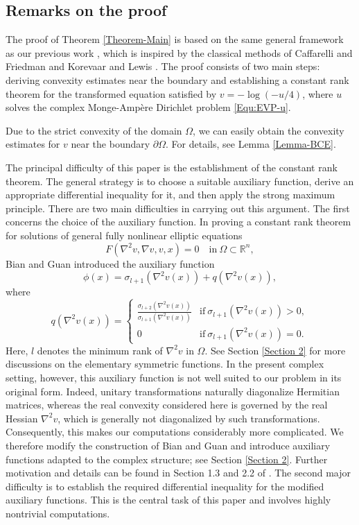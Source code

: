 \documentclass[11pt]{amsart}
\numberwithin{theorem}{section}
\numberwithin{equation}{section}
\begin{document}
\subsection{Remarks on the proof}\label{Section 1.3}
The proof of Theorem \ref{Theorem-Main} is based on the same general framework as our previous work \cite{Zhang-Zhou2025}, which is inspired by the classical methods of Caffarelli and Friedman \cite{Caffarelli-Friedman1985} and Korevaar and Lewis \cite{Korevaar-Lewis1987}. The proof consists of two main steps: deriving convexity estimates near the boundary and establishing a constant rank theorem for the transformed equation satisfied by $v=-\log(-u/4)$, where $u$ solves the complex Monge-Amp\`{e}re Dirichlet problem \eqref{Equ:EVP-u}.

Due to the strict convexity of the domain $\Omega$, we can easily obtain the convexity estimates for $v$ near the boundary $\partial\Omega$. For details, see Lemma \ref{Lemma-BCE}.

The principal difficulty of this paper is the establishment of the constant rank theorem. The general strategy is to choose a suitable auxiliary function, derive an appropriate differential inequality for it, and then apply the strong maximum principle. There are two main difficulties in carrying out this argument. The first concerns the choice of the auxiliary function. In proving a constant rank theorem for solutions of general fully nonlinear elliptic equations $$F(\nabla^2v,\nabla v,v,x)=0\quad\mathrm{in}\ \Omega\subset\mathbb{R}^n,$$ Bian and Guan \cite{Bian-Guan2009} introduced the auxiliary function $$\phi(x)=\sigma_{l+1}(\nabla^2v(x))+q(\nabla^2v(x)),$$ where $$q(\nabla^2v(x))=\begin{cases}
\frac{\sigma_{l+2}(\nabla^2v(x))}{\sigma_{l+1}(\nabla^2v(x))} & \mathrm{if}\ \sigma_{l+1}(\nabla^2v(x))>0,\\
0 & \mathrm{if}\ \sigma_{l+1}(\nabla^2v(x))=0.
\end{cases}$$ Here, $l$ denotes the minimum rank of $\nabla^2v$ in $\Omega$. See Section \ref{Section 2} for more discussions on the elementary symmetric functions. In the present complex setting, however, this auxiliary function is not well suited to our problem in its original form. Indeed, unitary transformations naturally diagonalize Hermitian matrices, whereas the real convexity considered here is governed by the real Hessian $\nabla^2v$, which is generally not diagonalized by such transformations. Consequently, this makes our computations considerably more complicated. We therefore modify the construction of Bian and Guan and introduce auxiliary functions adapted to the complex structure; see Section \ref{Section 2}. Further motivation and details can be found in Section 1.3 and 2.2 of \cite{Zhang-Zhou2025}. The second major difficulty is to establish the required differential inequality for the modified auxiliary functions. This is the central task of this paper and involves highly nontrivial computations.
\end{document}

